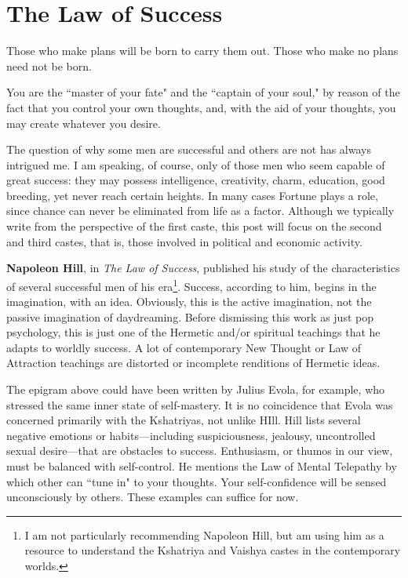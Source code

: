 \section{The Law of Success}

\begin{quotex}
Those who make plans will be born to carry them out. Those who make no plans need not be born. 

You are the ``master of your fate" and the ``captain of your soul," by reason of the fact that you control your own thoughts, and, with the aid of your thoughts, you may create whatever you desire. 

\end{quotex}
The question of why some men are successful and others are not has always intrigued me. I am speaking, of course, only of those men who seem capable of great success: they may possess intelligence, creativity, charm, education, good breeding, yet never reach certain heights. In many cases Fortune plays a role, since chance can never be eliminated from life as a factor. Although we typically write from the perspective of the first caste, this post will focus on the second and third castes, that is, those involved in political and economic activity.

\textbf{Napoleon Hill}, in \emph{The Law of Success}, published his study of the characteristics of several successful men of his era\footnote{I am not particularly recommending Napoleon Hill, but am using him as a resource to understand the Kshatriya and Vaishya castes in the contemporary worlds.}. Success, according to him, begins in the imagination, with an idea. Obviously, this is the active imagination, not the passive imagination of daydreaming. Before dismissing this work as just pop psychology, this is just one of the Hermetic and/or spiritual teachings that he adapts to worldly success. A lot of contemporary New Thought or Law of Attraction teachings are distorted or incomplete renditions of Hermetic ideas.

The epigram above could have been written by Julius Evola, for example, who stressed the same inner state of self-mastery. It is no coincidence that Evola was concerned primarily with the Kshatriyas, not unlike HIll. Hill lists several negative emotions or habits—including suspiciousness, jealousy, uncontrolled sexual desire—that are obstacles to success. Enthusiasm, or thumos in our view, must be balanced with self-control. He mentions the Law of Mental Telepathy by which other can ``tune in" to your thoughts. Your self-confidence will be sensed unconsciously by others. These examples can suffice for now.

